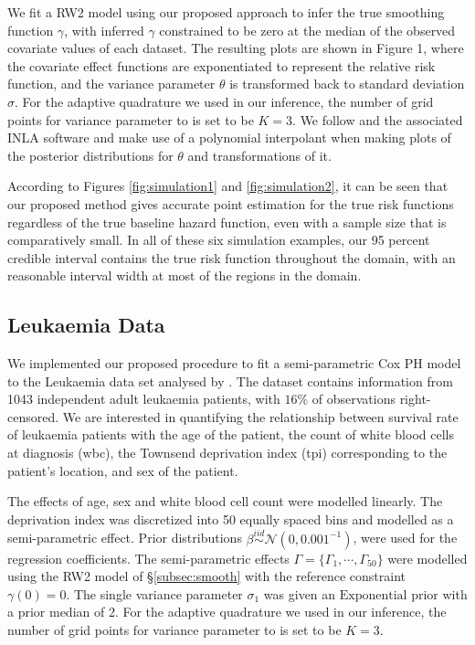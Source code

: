 \documentclass[ba]{imsart}
\begin{document}
We fit a RW2 model using our proposed approach to infer the true smoothing function $\gamma$, with inferred $\gamma$ constrained to be zero at the median of the observed covariate values of each dataset. The resulting plots are shown in Figure 1, where the covariate effect functions are exponentiated to represent the relative risk function, and the variance parameter $\theta$ is transformed back to standard deviation $\sigma$. For the adaptive quadrature we used in our inference, the number of grid points for variance parameter to is set to be $K = 3$. We follow \citet{inla} and the associated INLA software and make use of a polynomial interpolant when making plots of the posterior distributions for $\theta$ and transformations of it.

According to Figures \ref{fig:simulation1} and \ref{fig:simulation2}, it can be seen that our proposed method gives accurate point estimation for the true risk functions regardless of the true baseline hazard function, even with a sample size that is comparatively small. In all of these six simulation examples, our 95 percent credible interval contains the true risk function throughout the domain, with an reasonable interval width at most of the regions in the domain. 

\subsection{Leukaemia Data}\label{subsec:leuk}

We implemented our proposed procedure to fit a semi-parametric Cox PH model to the Leukaemia data set analysed by \cite{inlacoxph}. The dataset contains information from 1043 independent adult leukaemia patients, with $16\%$ of observations right-censored. We are interested in quantifying the relationship between survival rate of leukaemia patients with the age of the patient, the count of white blood cells at diagnosis (wbc), the Townsend deprivation index (tpi) corresponding to the patient's location, and sex of the patient.

The effects of age, sex and white blood cell count were modelled linearly. The deprivation index was discretized into 50 equally spaced bins and modelled as a semi-parametric effect. Prior distributions $\beta \stackrel{iid}{\sim} \mathcal{N}(0, 0.001^{-1})$, were used for the regression coefficients. The semi-parametric effects $\Gamma = \{\Gamma_{1}, \cdots, \Gamma_{50}\}$ were modelled using the RW2 model of \S\ref{subsec:smooth} with the reference constraint $\gamma(0) = 0$. The single variance parameter $\sigma_{1}$ was given an $\text{Exponential}$ prior with a prior median of 2. For the adaptive quadrature we used in our inference, the number of grid points for variance parameter to is set to be $K = 3$.
\end{document}
